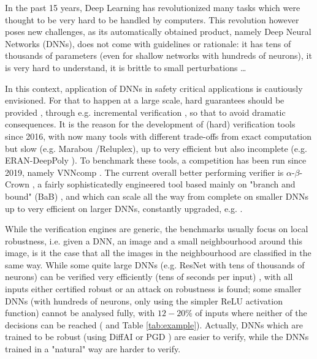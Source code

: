 In the past 15 years, Deep Learning has revolutionized many tasks which were thought to be very hard to be handled by computers. This revolution however poses new challenges, as its automatically obtained product, namely Deep Neural Networks (DNNs), does not come with guidelines or rationale: it has tens of thousands of parameters (even for shallow networks with hundreds of neurons), it is very hard to understand, it is brittle to small perturbations \cite{szegedy}\dots

In this context, application of DNNs in safety critical applications is cautiously envisioned. For that to happen at a large scale, hard guarantees should be provided \cite{certification}, through e.g. incremental verification \cite{incremental}, so that to avoid dramatic consequences. It is the reason for the development of (hard) verification tools since 2016, with now many tools with different trade-offs from exact computation but slow (e.g. Marabou \cite{katz2019marabou}/Reluplex\cite{Reluplex}), up to very efficient but also incomplete (e.g. ERAN-DeepPoly \cite{deeppoly}). To benchmark these tools, a competition has been run since 2019, namely VNNcomp \cite{VNNcomp}. The current overall better performing verifier is $\alpha$-$\beta$-Crown \cite{crown}, a fairly sophisticatedly engineered tool based mainly on "branch and bound" (BaB) \cite{BaB}, and which can scale all the way from complete on smaller DNNs \cite{xu2020fast} up to very efficient on larger DNNs, constantly upgraded, e.g. \cite{cutting}. 

While the verification engines are generic, the benchmarks usually focus on local robustness, i.e. given a DNN, an image and a small neighbourhood around this image, 
is it the case that all the images in the neighbourhood are classified in the same way.
While some quite large DNNs (e.g. ResNet with tens of thousands of neurons) can be verified very efficiently (tens of seconds per input) \cite{crown}, with all inputs either certified robust or an attack on robustness is found; some smaller DNNs (with hundreds of neurons, only using the simpler ReLU activation function) cannot be analysed fully, with $12-20\%$ of inputs where neither of the decisions can be reached (\cite{crown} and Table \ref{tab:example}). Actually, DNNs which are trained to be robust (using DiffAI \cite{DiffAI} or PGD \cite{PGD}) are easier to verify, while the DNNs trained in a "natural" way are harder to verify.


